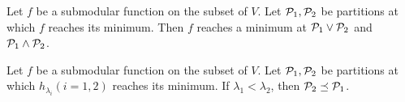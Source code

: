 \begin{theorem}\label{thm:lattice}
Let $f$ be a submodular function on the subset of $V$. Let $\P_1, \P_2$ be partitions
at which $f$ reaches its minimum. Then $f$ reaches a minimum at $\P_1 \vee \P_2$ and $\P_1 \wedge \P_2$.
\end{theorem}

\begin{theorem}\label{thm:lattice}
Let $f$ be a submodular function on the subset of $V$. Let $\P_1, \P_2$ be partitions
at which $h_{\lambda_i}(i=1,2)$ reaches its minimum. 
If $\lambda_1 < \lambda_2$, then $\P_2 \preceq \P_1$.
\end{theorem}